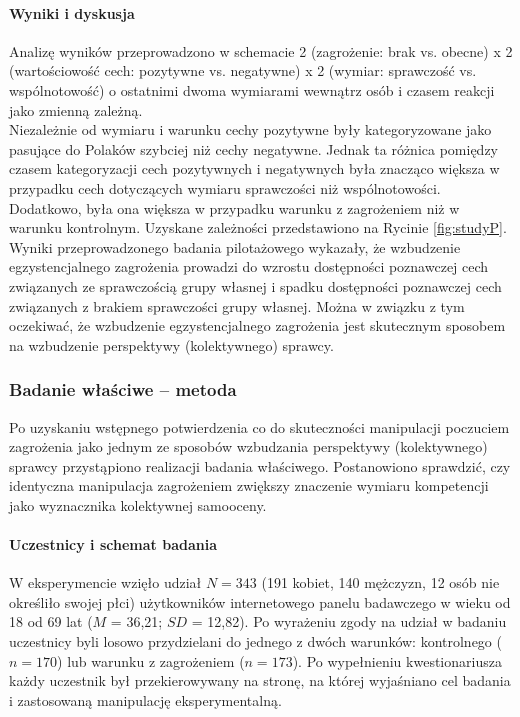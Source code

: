 \documentclass[man]{apa6}
\begin{document}
\paragraph{Wyniki i dyskusja}
Analizę wyników przeprowadzono w schemacie 2 (zagrożenie: brak vs. obecne) x 2 (wartościowość cech: pozytywne vs. negatywne) x 2 (wymiar: sprawczość vs. wspólnotowość) o ostatnimi dwoma wymiarami wewnątrz osób i czasem reakcji jako zmienną zależną.\\

Niezależnie od wymiaru i warunku cechy pozytywne były kategoryzowane jako pasujące do Polaków szybciej niż cechy negatywne. Jednak ta różnica pomiędzy czasem kategoryzacji cech pozytywnych i negatywnych była znacząco większa w przypadku cech dotyczących wymiaru sprawczości niż wspólnotowości. Dodatkowo, była ona większa w przypadku warunku z zagrożeniem niż w warunku kontrolnym. Uzyskane zależności przedstawiono na Rycinie \ref{fig:studyP}.\\

Wyniki przeprowadzonego badania pilotażowego wykazały, że wzbudzenie egzystencjalnego zagrożenia prowadzi do wzrostu dostępności poznawczej cech związanych ze sprawczością grupy własnej i spadku dostępności poznawczej cech związanych z brakiem sprawczości grupy własnej. Można w związku z tym oczekiwać, że wzbudzenie egzystencjalnego zagrożenia jest skutecznym sposobem na wzbudzenie perspektywy (kolektywnego) sprawcy.

\begin{figure*}[htbp]
   \centering
   \caption{Szybkość kategoryzacji, jako charakterystyczne dla Polaków, pozytywnych i negatywnch cech sprawczych i wspólnotowych a obecność zagrożenia.}
   \label{fig:studyP}
\end{figure*}

\subsubsection{Badanie właściwe -- metoda}

Po uzyskaniu wstępnego potwierdzenia co do skuteczności manipulacji poczuciem zagrożenia jako jednym ze sposobów wzbudzania perspektywy (kolektywnego) sprawcy przystąpiono realizacji badania właściwego. Postanowiono sprawdzić, czy identyczna manipulacja zagrożeniem zwiększy znaczenie wymiaru kompetencji jako wyznacznika kolektywnej samooceny.

\paragraph{Uczestnicy i schemat badania}
W eksperymencie wzięło udział $N=343$ (191 kobiet, 140 mężczyzn, 12 osób nie określiło swojej płci) użytkowników internetowego panelu badawczego w wieku od 18 od 69 lat ($M$ = 36,21; $SD$ = 12,82). Po wyrażeniu zgody na udział w badaniu uczestnicy byli losowo przydzielani do jednego z dwóch warunków: kontrolnego ($n = 170$) lub warunku z zagrożeniem ($n = 173$). Po wypełnieniu kwestionariusza każdy uczestnik był przekierowywany na stronę, na której wyjaśniano cel badania i zastosowaną manipulację eksperymentalną.
\end{document}
